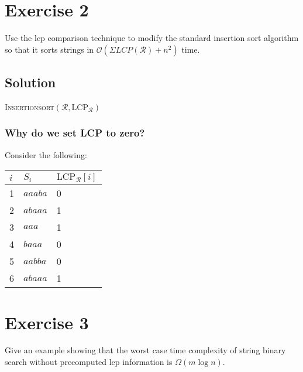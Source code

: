 \documentclass[10pt]{article}
\begin{document}
\section*{Exercise 2}
\color{blue}
Use the lcp comparison technique to modify the standard insertion sort algorithm so that it sorts strings in $\mathcal{O}(\Sigma LCP(\mathcal{R}) + n^2)$ time.
\color{black}

\subsection*{Solution}

\begin{algorithm}
\caption{\textsc{Insertionsort}$(\mathcal{R}, \text{LCP}_{\mathcal{R}})$}
\end{algorithm}

\subsubsection*{Why do we set LCP to zero?}
Consider the following:
\begin{center}
\begin{tabular}{|l|l|l|}
\hline
$i$ & $S_i$ & $\text{LCP}_{\mathcal{R}}[i]$ \\
\hline
1 & $aaaba$ & 0 \\
2 & $abaaa$ & 1 \\
3 & $aaa$     & 1 \\
4 & $baaa$   & 0 \\
5 & $aabba$ & 0 \\
6 & $abaaa$ & 1 \\
\hline
\end{tabular}
\end{center}

\section*{Exercise 3}
\color{blue}
Give an example showing that the worst case time complexity of string binary search without precomputed lcp information is $\Omega(m \log n)$.
\color{black}
\end{document}
